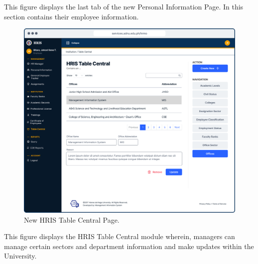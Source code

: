     This figure displays the last tab of the new Personal Information Page. In this section contains their employee information.

    \begin{figure}[H]
        \centering
        \includegraphics[width=1\linewidth]{figures/app/table-central.png}
        \caption{New HRIS Table Central Page.}
        \label{fig:enter-label}
    \end{figure}

    This figure displays the HRIS Table Central module wherein, managers can manage certain sectors and department information and make updates within the University.

